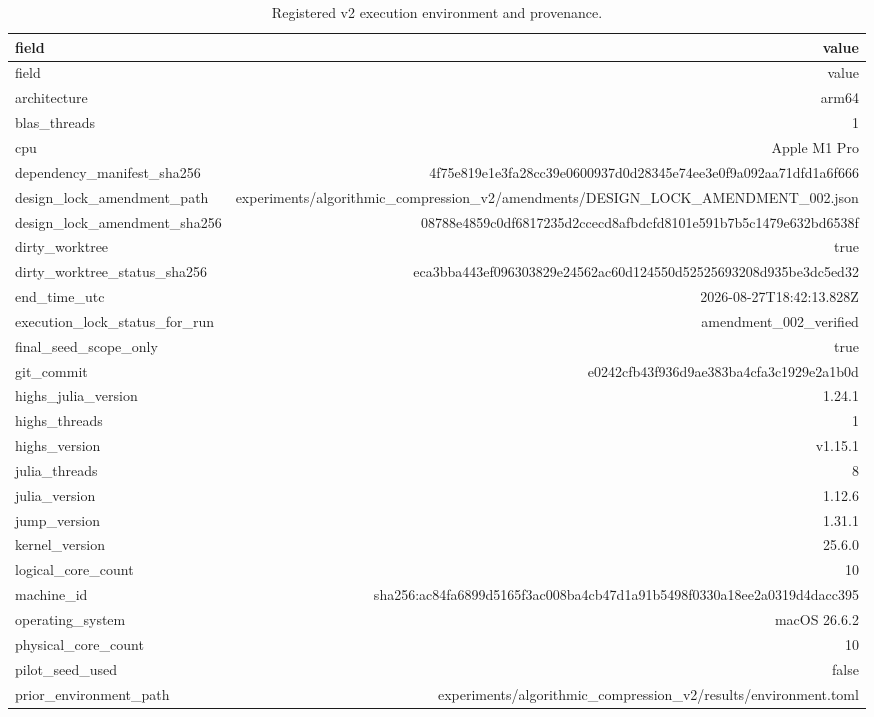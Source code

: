 {\footnotesize
\begin{longtable}{lr}
\caption{Registered v2 execution environment and provenance.}\label{tab:aor-environment}\\
\toprule
field & value \\
\midrule
\endfirsthead
\toprule
field & value \\
\midrule
\endhead
architecture & arm64 \\
blas\_threads & 1 \\
cpu & Apple M1 Pro \\
dependency\_manifest\_sha256 & 4f75e819e1e3fa28cc39e0600937d0d28345e74ee3e0f9a092aa71dfd1a6f666 \\
design\_lock\_amendment\_path & experiments/algorithmic\_compression\_v2/amendments/DESIGN\_LOCK\_AMENDMENT\_002.json \\
design\_lock\_amendment\_sha256 & 08788e4859c0df6817235d2ccecd8afbdcfd8101e591b7b5c1479e632bd6538f \\
dirty\_worktree & true \\
dirty\_worktree\_status\_sha256 & eca3bba443ef096303829e24562ac60d124550d52525693208d935be3dc5ed32 \\
end\_time\_utc & 2026-08-27T18:42:13.828Z \\
execution\_lock\_status\_for\_run & amendment\_002\_verified \\
final\_seed\_scope\_only & true \\
git\_commit & e0242cfb43f936d9ae383ba4cfa3c1929e2a1b0d \\
highs\_julia\_version & 1.24.1 \\
highs\_threads & 1 \\
highs\_version & v1.15.1 \\
julia\_threads & 8 \\
julia\_version & 1.12.6 \\
jump\_version & 1.31.1 \\
kernel\_version & 25.6.0 \\
logical\_core\_count & 10 \\
machine\_id & sha256:ac84fa6899d5165f3ac008ba4cb47d1a91b5498f0330a18ee2a0319d4dacc395 \\
operating\_system & macOS 26.6.2 \\
physical\_core\_count & 10 \\
pilot\_seed\_used & false \\
prior\_environment\_path & experiments/algorithmic\_compression\_v2/results/environment.toml \\

\end{longtable}}
